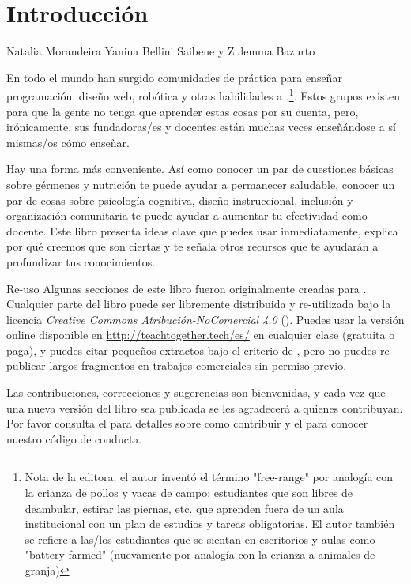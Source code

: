 \chapter{Introducción}\label{s:intro}

\begin{reviewer}
{Natalia Morandeira}
{Yanina Bellini Saibene y Zulemma Bazurto}
\end{reviewer}

En todo el mundo han surgido comunidades de práctica
para enseñar programación, diseño web, robótica y otras habilidades 
a .\footnote{Nota de la editora: el autor inventó el término "free-range" 
por analogía con la crianza de pollos y vacas de campo: estudiantes que son libres de deambular, estirar las piernas, etc.
que aprenden fuera de un aula institucional con un plan de estudios y tareas obligatorias. 
El autor también se refiere a las/los estudiantes 
que se sientan en escritorios y aulas como "battery-farmed" 
(nuevamente por analogía con la crianza a animales de granja)}.
Estos grupos existen para que la gente no tenga que aprender estas cosas por su cuenta,
pero, irónicamente,
sus fundadoras/es y docentes están muchas veces enseñándose a sí mismas/os cómo enseñar.

Hay una forma más conveniente.
Así como conocer un par de cuestiones básicas sobre gérmenes y nutrición te puede ayudar a permanecer saludable,
conocer un par de cosas sobre psicología cognitiva,
diseño instruccional,
inclusión
y organización comunitaria
te puede ayudar a aumentar tu efectividad como docente.
Este libro presenta ideas clave que puedes usar inmediatamente,
explica por qué creemos que son ciertas
y te señala otros recursos que te ayudarán a profundizar tus conocimientos.

\begin{aside}{Re-uso}
Algunas secciones de este libro fueron originalmente creadas para
 .
 Cualquier parte del libro puede ser libremente distribuida y re-utilizada
bajo la licencia \emph{Creative Commons Atribución-NoComercial 4.0}
 ().
Puedes usar la versión online disponible en \url{http://teachtogether.tech/es/} 
en cualquier clase
(gratuita o paga),
y puedes citar pequeños extractos bajo el criterio de ,
pero no puedes re-publicar largos fragmentos en trabajos comerciales sin permiso previo.

Las contribuciones, correcciones y sugerencias son bienvenidas,
y cada vez que una nueva versión del libro sea publicada se les agradecerá a quienes contribuyan.
Por favor consulta el  para detalles sobre como contribuir
y el  para conocer nuestro código de conducta. 
\end{aside}

